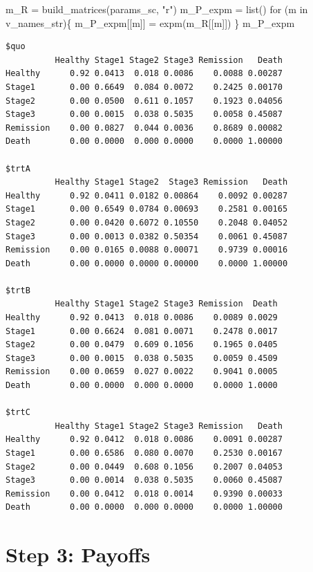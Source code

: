 \documentclass[
  letterpaper,
  DIV=11,
  numbers=noendperiod,
  oneside]{scrartcl}
\newenvironment{Shaded}{\begin{snugshade}}{\end{snugshade}}
\newcommand{\ControlFlowTok}[1]{\textcolor[rgb]{0.00,0.23,0.31}{#1}}
\newcommand{\FunctionTok}[1]{\textcolor[rgb]{0.28,0.35,0.67}{#1}}
\newcommand{\NormalTok}[1]{\textcolor[rgb]{0.00,0.23,0.31}{#1}}
\newcommand{\OtherTok}[1]{\textcolor[rgb]{0.00,0.23,0.31}{#1}}
\newcommand{\StringTok}[1]{\textcolor[rgb]{0.13,0.47,0.30}{#1}}
\begin{document}
\begin{Shaded}
\begin{Highlighting}[]
\NormalTok{m\_R }\OtherTok{=} \FunctionTok{build\_matrices}\NormalTok{(params\_sc, }\StringTok{"r"}\NormalTok{)}
\NormalTok{m\_P\_expm }\OtherTok{=} \FunctionTok{list}\NormalTok{()}
\ControlFlowTok{for}\NormalTok{ (m }\ControlFlowTok{in}\NormalTok{ v\_names\_str)\{}
\NormalTok{  m\_P\_expm[[m]] }\OtherTok{=} \FunctionTok{expm}\NormalTok{(m\_R[[m]])}
\NormalTok{\}}
\NormalTok{m\_P\_expm}
\end{Highlighting}
\end{Shaded}

\begin{verbatim}
$quo
          Healthy Stage1 Stage2 Stage3 Remission   Death
Healthy      0.92 0.0413  0.018 0.0086    0.0088 0.00287
Stage1       0.00 0.6649  0.084 0.0072    0.2425 0.00170
Stage2       0.00 0.0500  0.611 0.1057    0.1923 0.04056
Stage3       0.00 0.0015  0.038 0.5035    0.0058 0.45087
Remission    0.00 0.0827  0.044 0.0036    0.8689 0.00082
Death        0.00 0.0000  0.000 0.0000    0.0000 1.00000

$trtA
          Healthy Stage1 Stage2  Stage3 Remission   Death
Healthy      0.92 0.0411 0.0182 0.00864    0.0092 0.00287
Stage1       0.00 0.6549 0.0784 0.00693    0.2581 0.00165
Stage2       0.00 0.0420 0.6072 0.10550    0.2048 0.04052
Stage3       0.00 0.0013 0.0382 0.50354    0.0061 0.45087
Remission    0.00 0.0165 0.0088 0.00071    0.9739 0.00016
Death        0.00 0.0000 0.0000 0.00000    0.0000 1.00000

$trtB
          Healthy Stage1 Stage2 Stage3 Remission  Death
Healthy      0.92 0.0413  0.018 0.0086    0.0089 0.0029
Stage1       0.00 0.6624  0.081 0.0071    0.2478 0.0017
Stage2       0.00 0.0479  0.609 0.1056    0.1965 0.0405
Stage3       0.00 0.0015  0.038 0.5035    0.0059 0.4509
Remission    0.00 0.0659  0.027 0.0022    0.9041 0.0005
Death        0.00 0.0000  0.000 0.0000    0.0000 1.0000

$trtC
          Healthy Stage1 Stage2 Stage3 Remission   Death
Healthy      0.92 0.0412  0.018 0.0086    0.0091 0.00287
Stage1       0.00 0.6586  0.080 0.0070    0.2530 0.00167
Stage2       0.00 0.0449  0.608 0.1056    0.2007 0.04053
Stage3       0.00 0.0014  0.038 0.5035    0.0060 0.45087
Remission    0.00 0.0412  0.018 0.0014    0.9390 0.00033
Death        0.00 0.0000  0.000 0.0000    0.0000 1.00000
\end{verbatim}

\hypertarget{step-3-payoffs}{%
\section{Step 3: Payoffs}\label{step-3-payoffs}}
\end{document}
